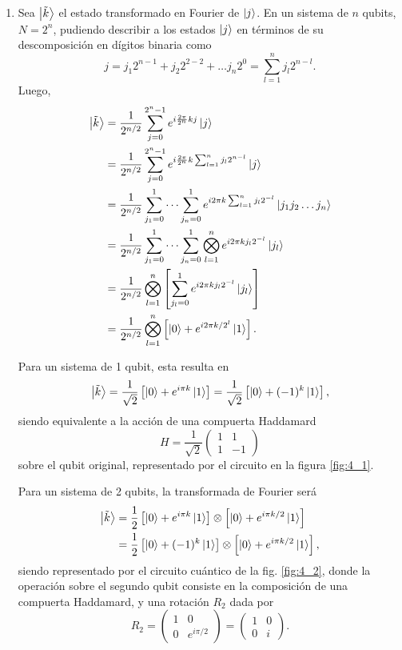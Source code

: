 \documentclass{scrartcl}
\newcommand{\inv}[1]{\frac{1}{#1}}
\DeclareRobustCommand{\[}{\begin{equation}}
\DeclareRobustCommand{\]}{\end{equation}}
\begin{document}
\begin{enumerate}
    \item Sea $\ket{\tilde{k}}$ el estado transformado en Fourier de $\ket{j}$. En un sistema de $n$ qubits, $N = 2^n$, pudiendo describir a los estados $\ket{j}$ en términos de su descomposición en dígitos binaria como
    \[ j = j_1 2^{n - 1} + j_2 2^{2 - 2} + \dots j_n 2^0 = \sum_{l = 1}^n j_l 2^{n - l}. \]
    Luego,
    \begin{align}
        \ket{\tilde{k}} &= \inv{2^{n/2}} \sum_{j = 0}^{2^n - 1} e^{i \frac{2\pi}{2^n} kj} \ket{j} \\
            &= \inv{2^{n/2}} \sum_{j = 0}^{2^n - 1} e^{i \frac{2\pi}{2^n} k \sum_{l = 1}^n j_l 2^{n - l} } \ket{j} \\
            &= \inv{2^{n/2}} \sum_{j_1 = 0}^{1} \dots \sum_{j_n = 0}^{1} e^{i 2\pi k \sum_{l = 1}^n j_l 2^{-l} } \ket{j_1 j_2 \dots j_n} \\
            &= \inv{2^{n/2}} \sum_{j_1 = 0}^{1} \dots \sum_{j_n = 0}^{1} \bigotimes_{l = 1}^n e^{i 2\pi k j_l 2^{-l} } \ket{j_l} \\
            &= \inv{2^{n/2}} \bigotimes_{l = 1}^n \left[ \sum_{j_l = 0}^{1} e^{i 2\pi k j_l 2^{-l} } \ket{j_l} \right] \\
            &= \inv{2^{n/2}} \bigotimes_{l = 1}^n \left[ \ket{0} + e^{i 2\pi k / 2^l } \ket{1} \right].
    \end{align}
    
    Para un sistema de 1 qubit, esta resulta en
    \[ \ket{\tilde{k}} = \inv{\sqrt{2}} \left[ \ket{0} + e^{i \pi k } \ket{1} \right] = \inv{\sqrt{2}} \left[ \ket{0} + (-1)^k \ket{1} \right], \]
    siendo equivalente a la acción de una compuerta Haddamard 
    \[ H = \inv{\sqrt{2}} \begin{pmatrix} 1 & 1 \\ 1 & -1 \end{pmatrix} \]
    sobre el qubit original, representado por el circuito en la figura \ref{fig:4_1}.
    
    Para un sistema de 2 qubits, la transformada de Fourier será
    \begin{align}
        \ket{\tilde{k}} &= \inv{2} \left[ \ket{0} + e^{i \pi k } \ket{1} \right] \otimes \left[ \ket{0} + e^{i \pi k / 2 } \ket{1} \right] \\
            &= \inv{2} \left[ \ket{0} + (-1)^k \ket{1} \right] \otimes \left[ \ket{0} + e^{i \pi k / 2 } \ket{1} \right],
    \end{align}
    siendo representado por el circuito cuántico de la fig. \ref{fig:4_2}, donde la operación sobre el segundo qubit consiste en la composición de una compuerta Haddamard, y una rotación $R_2$ dada por
    \[ R_2 = \begin{pmatrix} 1 & 0 \\ 0 & e^{i \pi / 2} \end{pmatrix} = \begin{pmatrix} 1 & 0 \\ 0 & i \end{pmatrix}. \]
    

\end{enumerate}
\end{document}
